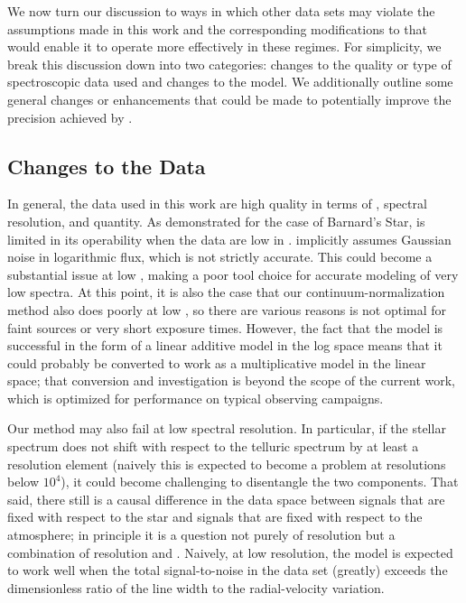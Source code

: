 \documentclass[modern]{aastex62}
\newcommand{\Mdwarf}{Barnard's Star\xspace} %
\begin{document}
We now turn our discussion to ways in which other data sets may violate the assumptions made in this work and the corresponding modifications to \wobble that would enable it to operate more effectively in these regimes. 
For simplicity, we break this discussion down into two categories: changes to the quality or type of spectroscopic data used and changes to the model. 
We additionally outline some general changes or enhancements that could be made to potentially improve the \RV precision achieved by \wobble. 

\subsection{Changes to the Data}
\label{s:data-changes}

In general, the data used in this work are high quality in terms of \SNR, spectral resolution, and quantity. 
As demonstrated for the case of \Mdwarf, \wobble is limited in its operability when the data are low in \SNR. 
\wobble implicitly assumes Gaussian noise in logarithmic flux, which is not strictly accurate. 
This could become a substantial issue at low \SNR, making \wobble a poor tool choice for accurate modeling of very low \SNR spectra.
At this point, it is also the case that our continuum-normalization method also does poorly at low \SNR, so there are various reasons \wobble is not optimal for faint sources or very short exposure times.
However, the fact that the model is successful in the form of a linear additive model in the log space means that it could probably be converted to work as a multiplicative model in the linear space; that conversion and investigation is beyond the scope of the current work, which is optimized for performance on typical \HARPS observing campaigns.

Our method may also fail at low spectral resolution. 
In particular, if the stellar spectrum does not shift with respect to the telluric spectrum by at least a resolution element (naively this is expected to become a problem at resolutions below $10^4$), it could become challenging to disentangle the two components.
That said, there still is a causal difference in the data space between signals that are fixed with respect to the star and signals that are fixed with respect to the atmosphere; in principle it is a question not purely of resolution but a combination of resolution and \SNR.
Naively, at low resolution, the model is expected to work well when the total signal-to-noise in the data set (greatly) exceeds the dimensionless ratio of the line width to the radial-velocity variation.
\end{document}
